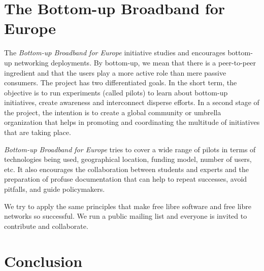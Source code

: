 \documentclass[journal]{IEEEtran}
\begin{document}



\section{The Bottom-up Broadband for Europe}

The \emph{Bottom-up Broadband for Europe} initiative studies and encourages bottom-up networking deployments.
By bottom-up, we mean that there is a peer-to-peer ingredient and that the users play a more active role than mere passive consumers.
The project has two differentiated goals.
In the short term, the objective is to run experiments (called pilots) to learn about bottom-up initiatives, create awareness and interconnect disperse efforts.
In a second stage of the project, the intention is to create a global community or umbrella organization that helps in promoting and coordinating the multitude of initiatives that are taking place.

\emph{Bottom-up Broadband for Europe} tries to cover a wide range of pilots in terms of technologies being used, geographical location, funding model, number of users, etc.
It also encourages the collaboration between students and experts and the preparation of profuse documentation that can help to repeat successes, avoid pitfalls, and guide policymakers.

We try to apply the same principles that make free libre software and free libre networks so successful.
We run a public mailing list and everyone is invited to contribute and collaborate.

\section{Conclusion} \label{sec:conclusion}
\end{document}
